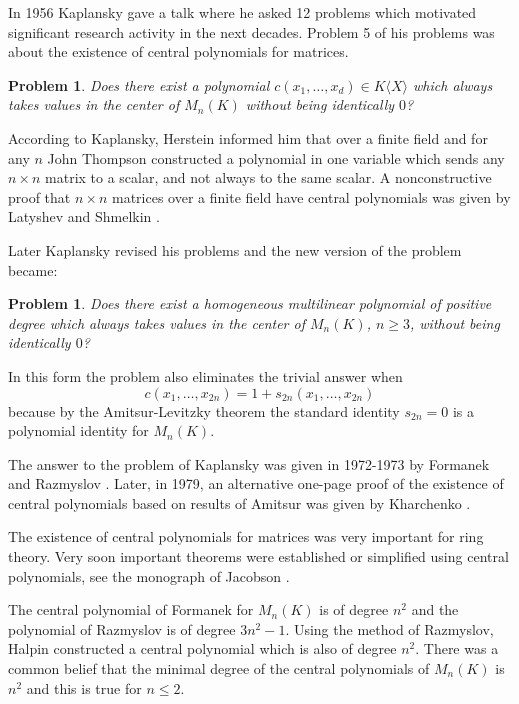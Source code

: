 \documentclass[12pt]{amsart}
\newtheorem{problem}[theorem]{Problem}
\theoremstyle{definition}
\begin{document}
In 1956 Kaplansky \cite{Kap1} gave a talk where he asked 12 problems which
motivated significant research activity in the next decades. Problem 5 of
his problems was about the existence of central polynomials for matrices.

\begin{problem}\label{Problem of Kaplansky}
Does there exist a polynomial $c(x_1,\ldots,x_d)\in K\langle X\rangle$ which always takes values in the center of $M_n(K)$
without being identically $0$?
\end{problem}

According to Kaplansky, Herstein informed him that over a finite field and for any $n$ John Thompson constructed a polynomial in one variable which sends
any $n\times n$ matrix to a scalar, and not always to the same scalar.
A nonconstructive proof that $n\times n$ matrices over a finite field have central polynomials was given by Latyshev and Shmelkin \cite{LaSh}.

Later Kaplansky \cite{Kap2} revised his problems and the new version of the problem became:

\begin{problem}\label{Revised problem of Kaplansky}\cite[Problem 16]{Kap2}
Does there exist a homogeneous multilinear polynomial of positive degree which always takes values in the center of $M_n(K)$, $n\geq 3$, without being identically $0$?
\end{problem}

In this form the problem also eliminates the trivial answer when
\[
c(x_1,\ldots,x_{2n})=1+s_{2n}(x_1,\ldots,x_{2n})
\]
because by the Amitsur-Levitzky theorem \cite{AmLev} the standard identity $s_{2n}=0$ is a polynomial identity for $M_n(K)$.

The answer to the problem of Kaplansky was given in 1972-1973
by Formanek \cite{Fo1} and Razmyslov \cite{Raz1}. Later, in 1979, an alternative one-page proof
of the existence of central polynomials
based on results of Amitsur was given by Kharchenko \cite{Kh}.

The existence of central polynomials for matrices was very important for ring theory.
Very soon important theorems were established or simplified using central polynomials, see the monograph of Jacobson \cite{Ja}.

The central polynomial of Formanek for $M_n(K)$ is of degree $n^2$
and the polynomial of Razmyslov is of degree $3n^2-1$.
Using the method of Razmyslov, Halpin \cite{Ha} constructed a central polynomial which is also of degree $n^2$.
There was a common belief that the minimal degree of the central polynomials of $M_n(K)$ is $n^2$
and this is true for $n\leq 2$.
\end{document}
